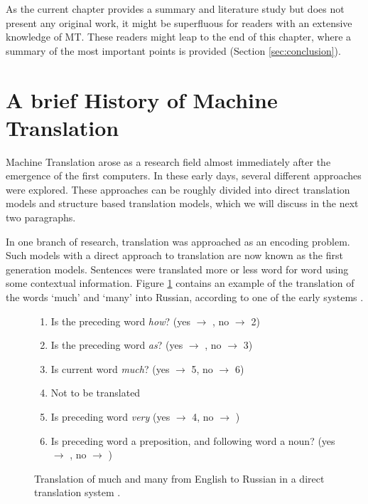 As the current chapter provides a summary and literature study but does not present any original work, it might be superfluous for readers with an extensive knowledge of MT. These readers might leap to the end of this chapter, where a summary of the most important points is provided (Section \ref{sec:conclusion}).

\section{A brief History of Machine Translation}
\label{sec:overview}

Machine Translation arose as a research field almost immediately after the emergence of the first computers. In these early days, several different approaches were explored. These approaches can be roughly divided into direct translation models and structure based translation models, which we will discuss in the next two paragraphs.

In one branch of research, translation was approached as an encoding problem. Such models with a direct approach to translation are now known as the first generation models. Sentences were translated more or less word for word using some contextual information. Figure \ref{fig:georgetown} contains an example of the translation of the words `much' and `many' into Russian, according to one of the early systems \citep{dostert1955georgetown}.

\begin{figure}[!ht]
\begin{framed}
\footnotesize{
\begin{enumerate}
\item[1] Is the preceding word \textit{how}? (yes $\rightarrow$ , no $\rightarrow$ 2)
\item[2] Is the preceding word \textit{as}? (yes $\rightarrow$ , no $\rightarrow$ 3)
\item[3] Is current word \textit{much}? (yes $\rightarrow$ 5, no $\rightarrow$ 6)
\item[4] Not to be translated
\item[5] Is preceding word \textit{very} (yes $\rightarrow$ 4, no $\rightarrow$ )
\item[6] Is preceding word a preposition, and following word a noun? (yes $\rightarrow$ , no $\rightarrow$ )
\end{enumerate}
}
\end{framed}
\caption{Translation of much and many from English to Russian in a direct translation system \citep[source][p.56]{hutchins1992introduction}.}\label{fig:georgetown}
\end{figure}

